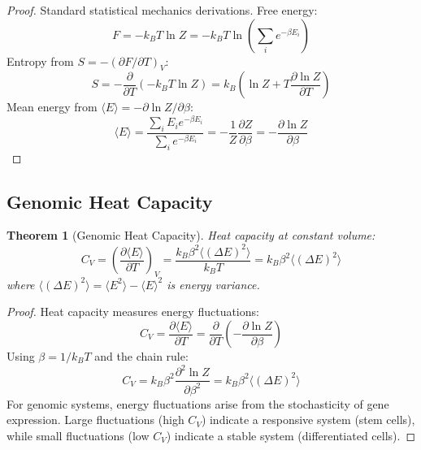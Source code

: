 \documentclass[11pt,a4paper]{article}
\newtheorem{theorem}{Theorem}[section]
\theoremstyle{remark}
\begin{document}
\begin{proof}
Standard statistical mechanics derivations. Free energy:
\begin{equation}
F = -k_BT\ln Z = -k_BT\ln\left(\sum_i e^{-\beta E_i}\right)
\end{equation}
Entropy from $S = -(\partial F/\partial T)_V$:
\begin{equation}
S = -\frac{\partial}{\partial T}(-k_BT\ln Z) = k_B(\ln Z + T\frac{\partial\ln Z}{\partial T})
\end{equation}
Mean energy from $\langle E\rangle = -\partial\ln Z/\partial\beta$:
\begin{equation}
\langle E\rangle = \frac{\sum_i E_i e^{-\beta E_i}}{\sum_i e^{-\beta E_i}} = -\frac{1}{Z}\frac{\partial Z}{\partial\beta} = -\frac{\partial\ln Z}{\partial\beta}
\end{equation}
\end{proof}

\subsection{Genomic Heat Capacity}

\begin{theorem}[Genomic Heat Capacity]
\label{thm:genomic_heat_capacity}
Heat capacity at constant volume:
\begin{equation}
C_V = \left(\frac{\partial\langle E\rangle}{\partial T}\right)_V = \frac{k_B\beta^2\langle(\Delta E)^2\rangle}{k_BT} = k_B\beta^2\langle(\Delta E)^2\rangle
\end{equation}
where $\langle(\Delta E)^2\rangle = \langle E^2\rangle - \langle E\rangle^2$ is energy variance.
\end{theorem}

\begin{proof}
Heat capacity measures energy fluctuations:
\begin{equation}
C_V = \frac{\partial\langle E\rangle}{\partial T} = \frac{\partial}{\partial T}\left(-\frac{\partial\ln Z}{\partial\beta}\right)
\end{equation}
Using $\beta = 1/k_BT$ and the chain rule:
\begin{equation}
C_V = k_B\beta^2\frac{\partial^2\ln Z}{\partial\beta^2} = k_B\beta^2\langle(\Delta E)^2\rangle
\end{equation}
For genomic systems, energy fluctuations arise from the stochasticity of gene expression. Large fluctuations (high $C_V$) indicate a responsive system (stem cells), while small fluctuations (low $C_V$) indicate a stable system (differentiated cells).
\end{proof}
\end{document}
